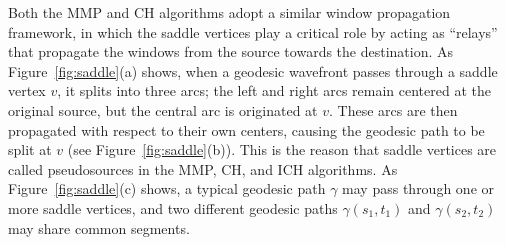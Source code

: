 Both the MMP and CH algorithms adopt a similar window propagation
framework, in which the saddle vertices play a critical role by
acting as ``relays'' that propagate the windows from the source
towards the destination. As Figure~\ref{fig:saddle}(a) shows, when a
geodesic wavefront passes through a saddle vertex $v$, it splits
into three arcs; the left and right arcs remain centered at the
original source, but the central arc is originated at $v$. These
arcs are then propagated with respect to their own centers, causing
the geodesic path to be split at $v$ (see
Figure~\ref{fig:saddle}(b)). This is the reason that saddle vertices
are called pseudosources in the MMP, CH, and ICH algorithms. As
Figure~\ref{fig:saddle}(c) shows, a typical geodesic path $\gamma$
may pass through one or more saddle vertices, and two different
geodesic paths $\gamma(s_1,t_1)$ and $\gamma(s_2,t_2)$ may share
common segments.

